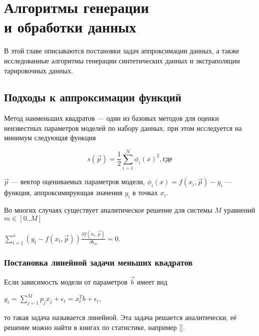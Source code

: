 \chapter{Алгоритмы генерации \\ и обработки данных} \label{chapt2}

В этой главе описываются постановки задач аппроксимации данных, а также исследованные алгоритмы генерации 
синтетических данных и
экстраполяции тарировочных данных. 


\section{Подходы к аппроксимации функций}\label{sect2_1}
Метод наименьших квадратов --- один из базовых методов для оценки неизвестных 
параметров моделей по набору данных, при этом исследуется на минимум
следующая функция

\begin{equation}
\label{eq:square_minimum}
s(\vec{p}) = \frac{1}{2} \displaystyle \sum_{i=1}^N \phi_i(x)^2 , где
\end{equation}




$\vec{p}$ --- вектор оцениваемых параметров модели, $\phi_i(x) = f(x_i, \vec{p}) - y_i $
--- функция, аппроксимирующая значения $y_i$ в точках $x_i$.

Во многих случаях существует аналитическое решение для системы $M$ уравнений 
$m \in [0..M]$
\begin{center}
 $ \displaystyle\sum_{t = 1}^n \left( y_t - f(x_t,\vec{p})\right) 
 \frac{\partial f(x_t, \vec{p})}{\partial b_m} = 0.$
\end{center}

\subsection{Постановка линейной задачи меньших квадратов}

Если зависимость модели от параметров $\vec{b}$ имеет вид 

\begin{center}
$ y_t = \displaystyle\sum_{j=1}^{M}p_j x_j + \epsilon_t = 
x^T_tb + \epsilon_t, $ 
\end{center}
 то такая задача называется линейной. Эта задача решается аналитически, 
её решение можно найти в книгах по статистике, например [].




